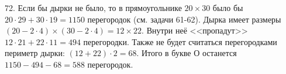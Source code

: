 72. Если бы дырки не было, то в прямоугольнике $20\times30$ было бы $20\cdot29+30\cdot19=1150$ перегородок (см. задачи 61-62). Дырка имеет размеры $(20-2\cdot4)\times(30-2\cdot4)=12\times22.$ Внутри неё <<пропадут>> $12\cdot21+22\cdot11=494$ перегородки. Также не будет считаться перегородками периметр дырки: $(12+22)\cdot2=68.$ Итого в букве О останется $1150-494-68=588$ перегородок.\\
